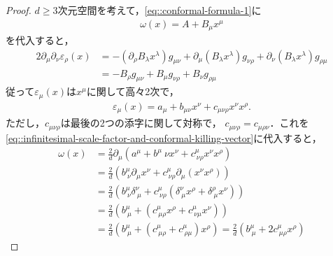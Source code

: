 \begin{proof}
	\(d\geq{}3\)次元空間を考えて，\cref{eq::conformal-formula-1}に
	\begin{align}
		\omega(x)=A+B_{\mu}x^{\mu}
	\end{align}
	を代入すると，
	\begin{align}
		2\partial_{\mu}\partial_{\nu}\varepsilon_{\rho}(x) & =-(\partial_{\rho}B_{\lambda}x^{\lambda})g_{\mu\nu}+\partial_{\mu}(B_{\lambda}x^{\lambda})g_{\nu\rho}+\partial_{\nu}(B_{\lambda}x^{\lambda})g_{\rho\mu} \\
		                                                   & =-B_{\rho}g_{\mu\nu}+B_{\mu}g_{\nu\rho}+B_{\nu}g_{\rho\mu}
	\end{align}
	従って\(\varepsilon_{\mu}(x)\)は\(x^{\mu}\)に関して高々2次で，
	\begin{align}
		\varepsilon_{\mu}(x)=a_{\mu}+b_{\mu\nu}x^{\nu}+c_{\mu\nu\rho}x^{\nu}x^{\rho}.
	\end{align}
	ただし，\(c_{\mu\nu\rho}\)は最後の2つの添字に関して対称で，
	\(c_{\mu\nu\rho}=c_{\mu\rho\nu}\)．これを
	\cref{eq::infinitesimal-scale-factor-and-conformal-killing-vector}に代入すると，
	\begin{align}
		\omega(x) & =\frac{2}{d}\partial_{\mu}\left(a^{\mu}+b^{\mu}{\ \nu}x^{\nu}+c^{\mu}_{\ \nu\rho}x^{\nu}x^{\rho}\right)                                                         \\
		          & =\frac{2}{d}\left(b^{\mu}_{\ \nu}\partial_{\mu}x^{\nu}+c^{\mu}_{\ \nu\rho}\partial_{\mu}(x^{\nu}x^{\rho})\right)                                                \\
		          & =\frac{2}{d}\left(b^{\mu}_{\ \nu}\delta^{\nu}_{\ \mu}+c^{\mu}_{\ \nu\rho}(\delta^{\nu}_{\ \mu}x^{\rho}+\delta^{\rho}_{\ \mu}x^{\nu})\right)                     \\\
		          & =\frac{2}{d}\left(b^{\mu}_{\ \mu}+(c^{\mu}_{\ \mu\rho}x^{\rho}+c^{\mu}_{\ \nu\mu}x^{\nu})\right)                                                                \\
		          & =\frac{2}{d}\left(b^{\mu}_{\ \mu}+(c^{\mu}_{\ \mu\rho}+c^{\mu}_{\ \rho\mu})x^{\rho}\right)=\frac{2}{d}\left(b^{\mu}_{\ \mu}+2c^{\mu}_{\ \mu\rho}x^{\rho}\right)
	\end{align}
\end{proof}

